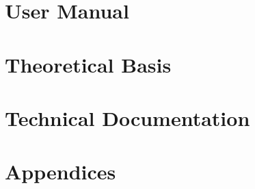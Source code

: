 \documentclass[12pt, letterpaper, fleqn]{report}
\begin{document}


\listoffigures

\tableofcontents

\part{User Manual}


\part{Theoretical Basis}


\part{Technical Documentation}

\part{Appendices}

\appendix



\end{document}

